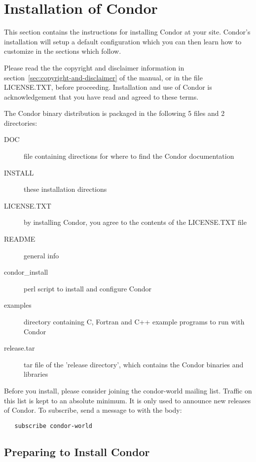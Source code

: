 \section{Installation of Condor}
\label{sec:install}

This section contains the instructions for installing Condor at your
site.  Condor's installation will setup a default configuration which
you can then learn how to customize in the sections which follow.

Please read the the copyright and disclaimer information in 
section~\ref{sec:copyright-and-disclaimer} of the manual, or in the
file LICENSE.TXT, before proceeding.  Installation and
use of Condor is acknowledgement that you have read and agreed to these
terms.

The Condor binary distribution is packaged in the following 5 files
and 2 directories:

\begin{description}
\item[DOC] file containing directions for where to find the 
		  Condor documentation
\item[INSTALL] these installation directions
\item[LICENSE.TXT] by installing Condor, you agree to the contents of
		  the LICENSE.TXT file
\item[README] general info
\item[condor\_install] perl script to install and configure Condor
\item[examples] directory containing C, Fortran and C++ example
		  programs to run with Condor
\item[release.tar] tar file of the 'release directory', which contains
		  the Condor binaries and libraries
\end{description}

Before you install, please consider joining the condor-world mailing
list.  Traffic on this list is kept to an absolute minimum.  It is only
used to announce new releases of Condor.  To subscribe, send a message
to  with the body:
\begin{verbatim}
   subscribe condor-world 
\end{verbatim}

\subsection{Preparing to Install Condor}

